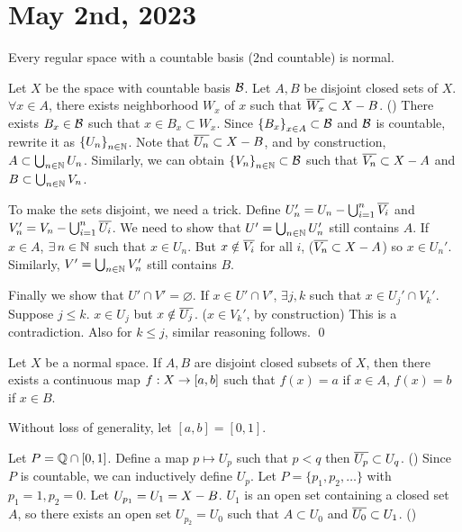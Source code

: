 \section*{May 2nd, 2023}

 Every regular space with a countable basis (2nd countable) is normal.

\pf Let \(X\) be the space with countable basis \(\mathcal{B}\). Let \(A, B\) be disjoint closed sets of \(X\). \(\forall x \in A\), there exists neighborhood \(W_x\) of \(x\) such that \(\overline{W_x} \subset X - B\). () There exists \(B_x \in \mathcal{B}\) such that \(x \in B_x \subset W_x\). Since \(\left\{ B_x \right\}_{x\in A} \subset \mathcal{B}\) and \(\mathcal{B}\) is countable, rewrite it as \(\left\{ U_n \right\}_{n \in \mathbb{N}}\). Note that \(\overline{U_n} \subset X - B\), and by construction, \(A \subset \bigcup_{n \in \mathbb{N}} U_n\). Similarly, we can obtain \(\left\{ V_n \right\}_{n \in \mathbb{N}} \subset \mathcal{B}\) such that \(\overline{V_n} \subset X - A\) and \(B \subset \bigcup_{n \in \mathbb{N}} V_n\).

To make the sets disjoint, we need a trick. Define \(U_n' = U_n - \bigcup_{i=1}^n \overline{V_i}\) and \(V_n' = V_n - \bigcup_{i=1}^n \overline{U_i}\). We need to show that \(U' = \bigcup_{n\in \mathbb{N}}U_n'\) still contains \(A\). If \(x \in A\), \(\exists n \in \N\) such that \(x \in U_n\). But \(x \notin \overline{V_i}\) for all \(i\), (\(\overline{V_n} \subset X - A\)) so \(x \in U_n'\). Similarly, \(V' = \bigcup_{n \in \mathbb{N}} V_n'\) still contains \(B\).

Finally we show that \(U' \cap V' = \varnothing\). If \(x \in U' \cap V'\), \(\exists j, k\) such that \(x \in U_j' \cap V_k'\). Suppose \(j \leq k\). \(x \in U_j\) but \(x \notin \overline{U_j}\). (\(x \in V_k'\), by construction) This is a contradiction. Also for \(k \leq j\), similar reasoning follows. \qed

\pagebreak


 Let \(X\) be a normal space. If \(A, B\) are disjoint closed subsets of \(X\), then there exists a continuous map \(f : X \rightarrow [a, b]\) such that \(f(x) = a\) if \(x \in A\), \(f(x) = b\) if \(x \in B\).

\pf Without loss of generality, let \([a, b] = [0, 1]\).

 Let \(P = \mathbb{Q} \cap [0, 1]\). Define a map \(p \mapsto U_p\) such that \(p < q\) then \(\overline{U_p} \subset U_q\). (\mast) Since \(P\) is countable, we can inductively define \(U_p\). Let \(P = \{p_1, p_2, \dots\}\) with \(p_1 = 1, p_2 = 0\). Let \(U_{p_1} = U_1 = X - B\). \(U_1\) is an open set containing a closed set \(A\), so there exists an open set \(U_{p_2} = U_0\) such that \(A \subset U_0\) and \(\overline{U_0} \subset U_1\). ()

